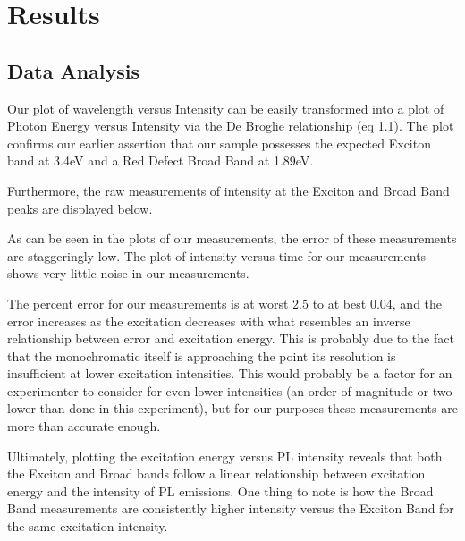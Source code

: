 \section{Results}
\subsection{Data Analysis}
	Our plot of wavelength versus Intensity can be easily transformed into a plot of Photon Energy versus Intensity via the De Broglie relationship (eq 1.1). The plot confirms our earlier assertion that our sample possesses the expected Exciton band at 3.4eV and a Red Defect Broad Band at 1.89eV. 
	

	Furthermore, the raw measurements of intensity at the Exciton and Broad Band peaks are displayed below.


	As can be seen in the plots of our measurements, the error of these measurements are staggeringly low. The plot of intensity versus time for our measurements shows very little noise in our measurements. 

	The percent error for our measurements is at worst $2.5$ to at best $0.04$, and the error increases as the excitation decreases with what resembles an inverse relationship between error and excitation energy. This is probably due to the fact that the monochromatic itself is approaching the point its resolution is insufficient at lower excitation intensities. This would probably be a factor for an experimenter to consider for even lower intensities (an order of magnitude or two lower than done in this experiment), but for our purposes these measurements are more than accurate enough.
	
	
	Ultimately, plotting the excitation energy versus PL intensity reveals that both the Exciton and Broad bands follow a linear relationship between excitation energy and the intensity of PL emissions. One thing to note is how the Broad Band measurements are consistently higher intensity versus the Exciton Band for the same excitation intensity.


